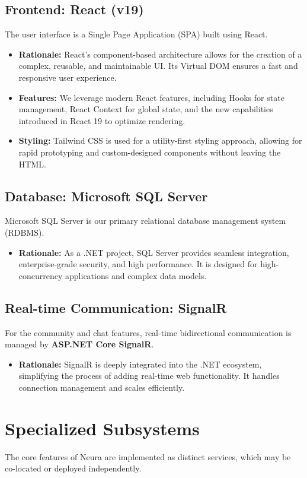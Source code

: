 \subsection{Frontend: \textbf{React (v19)}}
The user interface is a Single Page Application (SPA) built using React.
\begin{itemize}
    \item \textbf{Rationale:} React's component-based architecture allows for the creation of a complex, reusable, and maintainable UI. Its Virtual DOM ensures a fast and responsive user experience.
    \item \textbf{Features:} We leverage modern React features, including Hooks for state management, React Context for global state, and the new capabilities introduced in React 19 to optimize rendering.
    \item \textbf{Styling:} Tailwind CSS is used for a utility-first styling approach, allowing for rapid prototyping and custom-designed components without leaving the HTML.
\end{itemize}

\subsection{Database: \textbf{Microsoft SQL Server}}
Microsoft SQL Server is our primary relational database management system (RDBMS).
\begin{itemize}
    \item \textbf{Rationale:} As a .NET project, SQL Server provides seamless integration, enterprise-grade security, and high performance. It is designed for high-concurrency applications and complex data models.
\end{itemize}

\subsection{Real-time Communication: \textbf{SignalR}}
For the community and chat features, real-time bidirectional communication is managed by \textbf{ASP.NET Core SignalR}.
\begin{itemize}
    \item \textbf{Rationale:} SignalR is deeply integrated into the .NET ecosystem, simplifying the process of adding real-time web functionality. It handles connection management and scales efficiently.
\end{itemize}

\section{Specialized Subsystems}
The core features of Neura are implemented as distinct services, which may be co-located or deployed independently.


